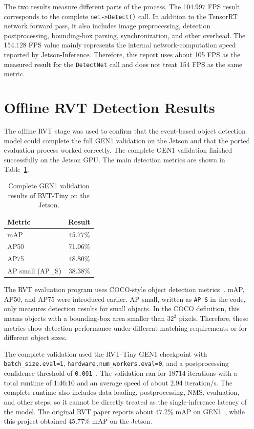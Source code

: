 The two results measure different parts of the process. The 104.997 FPS result corresponds to the complete \texttt{net->Detect()} call. In addition to the TensorRT network forward pass, it also includes image preprocessing, detection postprocessing, bounding-box parsing, synchronization, and other overhead. The 154.128 FPS value mainly represents the internal network-computation speed reported by Jetson-Inference. Therefore, this report uses about 105 FPS as the measured result for the \texttt{DetectNet} call and does not treat 154 FPS as the same metric.

\section{Offline RVT Detection Results}
\label{sec:rvt_results}

The offline RVT stage was used to confirm that the event-based object detection model could complete the full GEN1 validation on the Jetson and that the ported evaluation process worked correctly. The complete GEN1 validation finished successfully on the Jetson GPU. The main detection metrics are shown in Table~\ref{tab:rvt_gen1}.

\begin{table}[htbp]
\centering
\caption{Complete GEN1 validation results of RVT-Tiny on the Jetson.}
\label{tab:rvt_gen1}
\begin{tabular}{lc}
\toprule
Metric & Result \\
\midrule
mAP & 45.77\% \\
AP50 & 71.06\% \\
AP75 & 48.80\% \\
AP small (AP\_S) & 38.38\% \\
\bottomrule
\end{tabular}
\end{table}

The RVT evaluation program uses COCO-style object detection metrics~\parencite{rvtGithub}. mAP, AP50, and AP75 were introduced earlier. AP small, written as \texttt{AP\_S} in the code, only measures detection results for small objects. In the COCO definition, this means objects with a bounding-box area smaller than $32^2$ pixels. Therefore, these metrics show detection performance under different matching requirements or for different object sizes.

The complete validation used the RVT-Tiny GEN1 checkpoint with \texttt{batch\_size.eval=1}, \texttt{hardware.num\_workers.eval=0}, and a postprocessing confidence threshold of \texttt{0.001}~\parencite{rvtGithub}. The validation ran for 18714 iterations with a total runtime of 1:46:10 and an average speed of about 2.94 iteration/s. The complete runtime also includes data loading, postprocessing, NMS, evaluation, and other steps, so it cannot be directly treated as the single-inference latency of the model. The original RVT paper reports about 47.2\% mAP on GEN1~\parencite{gehrig2023}, while this project obtained 45.77\% mAP on the Jetson.

